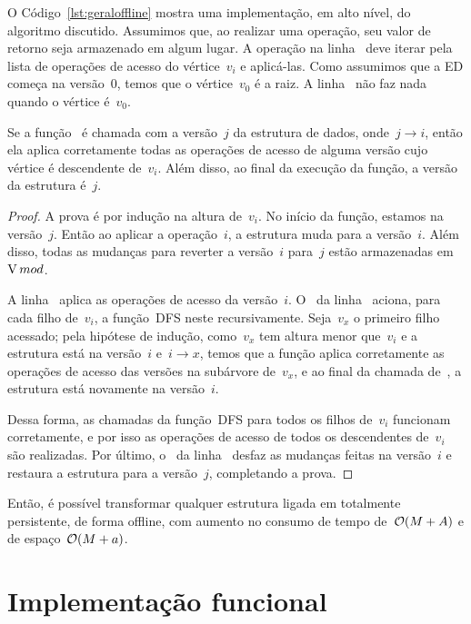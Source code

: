 \documentclass[main.tex]{subfiles}
\begin{document}
O Código~\ref{lst:geraloffline} mostra uma implementação, em alto nível, do algoritmo discutido. Assumimos que, ao realizar uma operação, seu valor de retorno seja armazenado em algum lugar. A operação na linha~ deve iterar pela lista de operações de acesso do vértice~$v_i$ e aplicá-las. Como assumimos que a ED começa na versão~0, temos que o vértice~$v_0$ é a raiz. A linha~ não faz nada quando o vértice é~$v_0$.

\begin{proposition}
	Se a função~{\normalfont {}} é chamada com a versão~$j$ da estrutura de dados, onde~${j \rightarrow i}$, então ela aplica corretamente todas as operações de acesso de alguma versão cujo vértice é descendente de~$v_i$. Além disso, ao final da execução da função, a versão da estrutura é~$j$.
\end{proposition}

\begin{proof}
A prova é por indução na altura de~$v_i$. No início da função, estamos na versão~$j$. Então ao aplicar a operação~$i$, a estrutura muda para a versão~$i$. Além disso, todas as mudanças para reverter a versão~$i$ para~$j$ estão armazenadas em~$\operatorname{V}{mod}$.

A linha~ aplica as operações de acesso da versão~$i$. O~ da linha~ aciona, para cada filho de~$v_i$, a função~\textsc{DFS} neste recursivamente. Seja~$v_x$ o primeiro filho acessado; pela hipótese de indução, como~$v_x$ tem altura menor que~$v_i$ e a estrutura está na versão~$i$ e~${i \rightarrow x}$, temos que a função aplica corretamente as operações de acesso das versões na subárvore de~$v_x$, e ao final da chamada de~, a estrutura está novamente na versão~$i$.

Dessa forma, as chamadas da função~\textsc{DFS} para todos os filhos de~$v_i$ funcionam corretamente, e por isso as operações de acesso de todos os descendentes de~$v_i$ são realizadas. Por último, o~ da linha~ desfaz as mudanças feitas na versão~$i$ e restaura a estrutura para a versão~$j$, completando a prova.
\end{proof}

Então, é possível transformar qualquer estrutura ligada em totalmente persistente, de forma offline, com aumento no consumo de tempo de~$\mathcal{O}(M+A)$ e de espaço~$\mathcal{O}(M + a)$.

\section{Implementação funcional} \label{sec:implfuncional}
\end{document}
